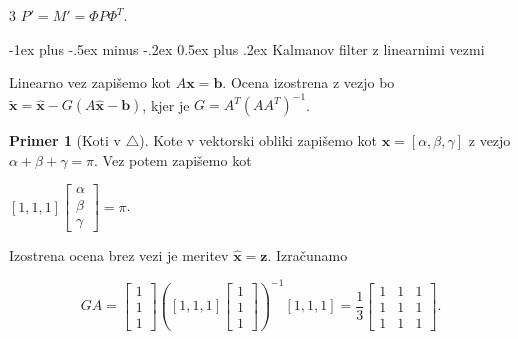 \documentclass[10pt,landscape]{article}
\makeatletter
\renewcommand{\section}{\@startsection{section}{1}{0mm}%
	{-1ex plus -.5ex minus -.2ex}%
	{0.5ex plus .2ex}%
	{\normalfont\large\bfseries}}
\theoremstyle{definition}
\newtheorem*{primer}{Primer}
\makeatother
\begin{document}
\begin{multicols}{3}
\( P' = M' = \Phi P \Phi^T \).

\section{Kalmanov filter z linearnimi vezmi}

Linearno vez zapišemo kot \( A \mathbf{x} = \mathbf{b} \). Ocena izostrena z vezjo bo \( \tilde{\mathbf{x}} = \hat{\mathbf{x}} - G \left( A \hat{\mathbf{x}} - \mathbf{b} \right) \), kjer je \( G = A^T \left( A A^T \right)^{-1} \).

\begin{primer}[Koti v \(\triangle\)]
  Kote v vektorski obliki zapišemo kot \( \mathbf{x} = [\alpha, \beta, \gamma] \) z vezjo \( \alpha + \beta + \gamma = \pi \). Vez potem zapišemo kot

  \( [1, 1, 1] \begin{bmatrix} \alpha \\ \beta \\ \gamma \end{bmatrix} = \pi
  \).

  Izostrena ocena brez vezi je meritev \( \hat{\mathbf{x}} = \mathbf{z} \). Izračunamo

  \[ GA = \begin{bmatrix} 1 \\ 1 \\ 1 \end{bmatrix} \left( [1, 1, 1] \begin{bmatrix} 1 \\ 1 \\ 1 \end{bmatrix} \right)^{-1} [1, 1, 1] = \frac{1}{3} \begin{bmatrix}
                                                                                                                                                    1 & 1 & 1 \\
                                                                                                                                                    1 & 1 & 1 \\
                                                                                                                                                    1 & 1 & 1
                                                                                                                                                    \end{bmatrix}.
  \]


\end{primer}
\end{multicols}
\end{document}
